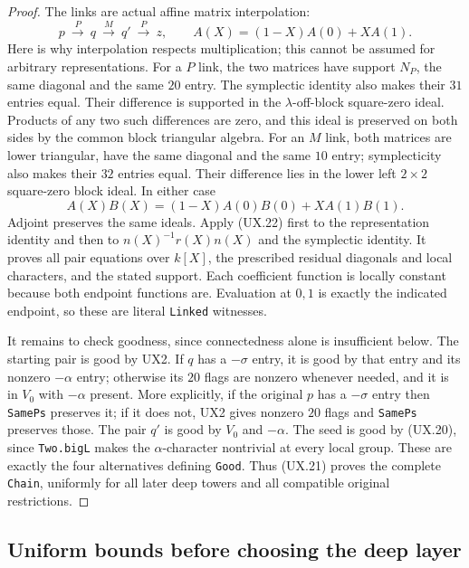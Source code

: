 \begin{proof}
The links are actual affine matrix interpolation:
\[
 p\ \xrightarrow{\ P\ }\ q\
   \xrightarrow{\ M\ }\ q'\
   \xrightarrow{\ P\ }\ z,
 \qquad A(X)=(1-X)A(0)+XA(1).
 \tag{UX.21}
\]
Here is why interpolation respects multiplication;
this cannot be assumed for arbitrary representations.
For a $P$ link, the two matrices have support $N_P$,
the same diagonal and the same $20$ entry.  The
symplectic identity also makes their $31$ entries
equal.  Their difference is supported in the
$\lambda$-off-block square-zero ideal.  Products
of any two such differences are zero, and this
ideal is preserved on both sides by the common
block triangular algebra.  For an $M$ link, both
matrices are lower triangular, have the same
diagonal and the same $10$ entry; symplecticity
also makes their $32$ entries equal.  Their
difference lies in the lower left $2\times2$
square-zero block ideal.  In either case
\[
 A(X)B(X)=(1-X)A(0)B(0)+XA(1)B(1).
 \tag{UX.22}
\]
Adjoint preserves the same ideals.  Apply (UX.22)
first to the representation identity and then to
$n(X)^{-1}r(X)n(X)$ and the symplectic identity.
It proves all pair equations over $k[X]$, the
prescribed residual diagonals and local characters,
and the stated support.  Each coefficient function
is locally constant because both endpoint functions
are.  Evaluation at $0,1$ is exactly the indicated
endpoint, so these are literal \texttt{Linked}
witnesses.

It remains to check goodness, since connectedness
alone is insufficient below.  The starting pair is
good by UX2.  If $q$ has a $-\sigma$ entry, it is
good by that entry and its nonzero $-\alpha$ entry;
otherwise its $20$ flags are nonzero whenever
needed, and it is in $V_0$ with $-\alpha$ present.
More explicitly, if the original $p$ has a
$-\sigma$ entry then \texttt{SamePs} preserves it;
if it does not, UX2 gives nonzero $20$ flags and
\texttt{SamePs} preserves those.  The pair $q'$
is good by $V_0$ and $-\alpha$.  The seed is good
by (UX.20), since \texttt{Two.bigL} makes the
$\alpha$-character nontrivial at every local group.
These are exactly the four alternatives defining
\texttt{Good}.  Thus (UX.21) proves the complete
\texttt{Chain}, uniformly for all later deep towers
and all compatible original restrictions.
\end{proof}

\subsection{Uniform bounds before choosing the deep layer}


